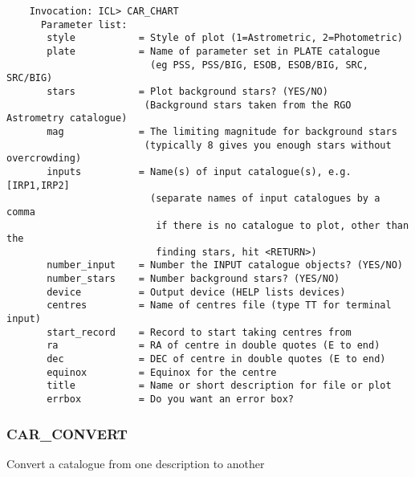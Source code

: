 \begin{verbatim}
    Invocation: ICL> CAR_CHART
      Parameter list:
       style           = Style of plot (1=Astrometric, 2=Photometric)
       plate           = Name of parameter set in PLATE catalogue
                         (eg PSS, PSS/BIG, ESOB, ESOB/BIG, SRC, SRC/BIG)
       stars           = Plot background stars? (YES/NO)
                        (Background stars taken from the RGO Astrometry catalogue)
       mag             = The limiting magnitude for background stars
                        (typically 8 gives you enough stars without overcrowding)
       inputs          = Name(s) of input catalogue(s), e.g. [IRP1,IRP2]
                         (separate names of input catalogues by a comma
                          if there is no catalogue to plot, other than the
                          finding stars, hit <RETURN>)
       number_input    = Number the INPUT catalogue objects? (YES/NO)
       number_stars    = Number background stars? (YES/NO)
       device          = Output device (HELP lists devices)
       centres         = Name of centres file (type TT for terminal input)
       start_record    = Record to start taking centres from
       ra              = RA of centre in double quotes (E to end)
       dec             = DEC of centre in double quotes (E to end)
       equinox         = Equinox for the centre
       title           = Name or short description for file or plot
       errbox          = Do you want an error box?
\end{verbatim}

\subsubsection{CAR\_CONVERT}

Convert a catalogue from one description to another

